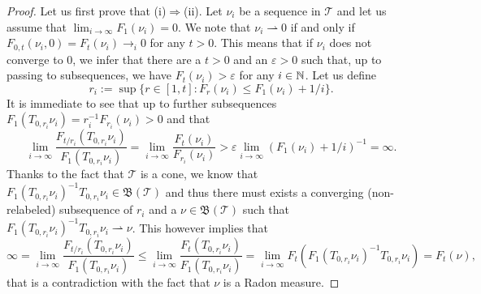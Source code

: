 \documentclass[10pt, a4paper,
oneside, headinclude,footinclude]{scrartcl}
\begin{document}
\begin{proof}
Let us first prove that (i)$\Rightarrow$(ii). Let $\nu_i$ be a sequence in $\mathcal{T}$ and let us assume that $\lim_{i\to\infty}F_{1}(\nu_i)=0$. %
We note that $\nu_i\rightharpoonup 0$ if and only if $F_{0,t}(\nu_i,0)=F_t(\nu_i)\to_i 0$ for any $t>0$. This means that if $\nu_i$ does not converge to $0$, we infer that there are  a $t>0$ and an $\varepsilon>0$ such that, up to passing to subsequences, we have $F_t(\nu_i)>\varepsilon$ for any $i\in\mathbb{N}$. 
Let us define
$$r_i:=\sup\{r\in[1,t]:F_r(\nu_i)\leq F_1(\nu_i)+1/i\}.$$
It is immediate to see that up to further subsequences
 $F_1(T_{0,r_i}\nu_i)=r_i^{-1}F_{r_i}(\nu_i)>0$ and that
  $$\lim_{i\to \infty} \frac{F_{t/r_i}(T_{0,r_i}\nu_i)}{F_1(T_{0,r_i}\nu_i)}=\lim_{i\to \infty}\frac{F_{t}(\nu_i)}{F_{r_i}(\nu_i)}>\varepsilon\lim_{i\to\infty}(F_1(\nu_i)+1/i)^{-1}=\infty.$$
Thanks to the fact that $\mathcal{T}$ is a cone, we know that $F_1(T_{0,r_i}\nu_i)^{-1}T_{0,r_i}\nu_i\in \mathfrak{B}(\mathcal{T})$ and thus there must exists a converging (non-relabeled) subsequence of $r_i$ and a $\nu\in\mathfrak{B}(\mathcal{T})$ such that $F_1(T_{0,r_i}\nu_i)^{-1}T_{0,r_i}\nu_i\rightharpoonup\nu$. This however implies that
 $$\infty=\lim_{i\to\infty}\frac{F_{t/r_i}(T_{0,r_i}\nu_i)}{F_1(T_{0,r_i}\nu_i)}\leq \lim_{i\to\infty}\frac{F_{t}(T_{0,r_i}\nu_i)}{F_1(T_{0,r_i}\nu_i)}=\lim_{i\to\infty}F_{t}(F_1(T_{0,r_i}\nu_i)^{-1}T_{0,r_i}\nu_i)=F_t(\nu),$$
 that is a contradiction with the fact that $\nu$ is a Radon measure.
 

\end{proof}
\end{document}
